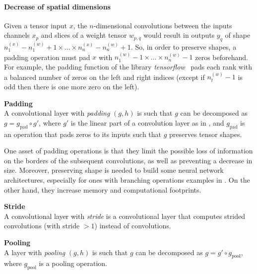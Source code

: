 \paragraph{Decrease of spatial dimensions}
Given a tensor input $x$, the $n$-dimensional convolutions between the inputs channels $x_p$ and slices of a weight tensor $w_{p,q}$ would result in outputs $y_q$ of shape $n_1^{(x)} - n_1^{(w)} + 1 \times \ldots \times n_n^{(x)} - n_n^{(w)} + 1$. So, in order to preserve shapes, a padding operation must pad $x$ with $n_1^{(w)} - 1 \times \ldots \times n_n^{(w)} - 1$ zeros beforehand. For example, the padding function of the library \emph{tensorflow}~\citep{tensorflow2015-whitepaper} pads each rank with a balanced number of zeros on the left and right indices (except if $n_t^{(w)} - 1$ is odd then there is one more zero on the left).

\begin{definition}\textbf{Padding}\\
A convolutional layer with \emph{padding} $(g, h)$ is such that $g$ can be decomposed as $g = g_\text{pad} \circ g'$, where $g'$ is the linear part of a convolution layer as in , and $g_\text{pad}$ is an operation that pads zeros to its inputs such that $g$ preserves tensor shapes.
\end{definition}

\begin{remark}
One asset of padding operations is that they limit the possible loss of information on the borders of the subsequent convolutions, as well as preventing a decrease in size. Moreover, preserving shape is needed to build some neural network architectures, especially for ones with branching operations \eg examples in . On the other hand, they increase memory and computational footprints.
\end{remark}

\begin{definition}\textbf{Stride}\\
A convolutional layer with \emph{stride} is a convolutional layer that computes strided convolutions (with stride $> 1$) instead of convolutions.
\end{definition}

\begin{definition}\textbf{Pooling}\\
A layer with \textit{pooling} $(g,h)$ is such that $g$ can be decomposed as $g = g' \circ g_\text{pool}$, where $g_\text{pool}$ is a pooling operation.
\end{definition}

